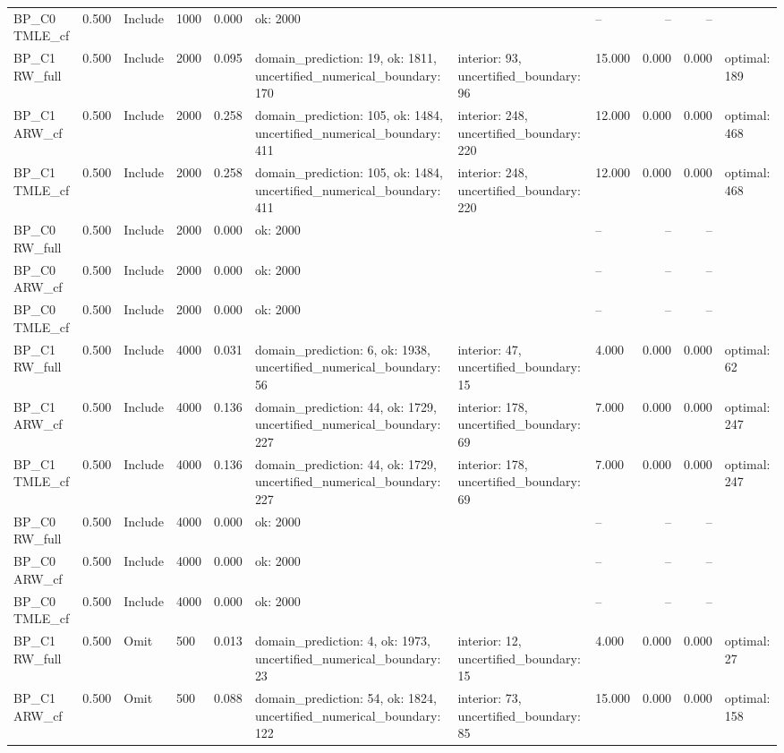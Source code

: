 \begin{tabular}{llllrlllrrl}
BP\_C0 TMLE\_cf & 0.500 & Include & 1000 & 0.000 & ok: 2000 &  & -- & -- & -- &  \\
BP\_C1 RW\_full & 0.500 & Include & 2000 & 0.095 & domain\_prediction: 19, ok: 1811, uncertified\_numerical\_boundary: 170 & interior: 93, uncertified\_boundary: 96 & 15.000 & 0.000 & 0.000 & optimal: 189 \\
BP\_C1 ARW\_cf & 0.500 & Include & 2000 & 0.258 & domain\_prediction: 105, ok: 1484, uncertified\_numerical\_boundary: 411 & interior: 248, uncertified\_boundary: 220 & 12.000 & 0.000 & 0.000 & optimal: 468 \\
BP\_C1 TMLE\_cf & 0.500 & Include & 2000 & 0.258 & domain\_prediction: 105, ok: 1484, uncertified\_numerical\_boundary: 411 & interior: 248, uncertified\_boundary: 220 & 12.000 & 0.000 & 0.000 & optimal: 468 \\
BP\_C0 RW\_full & 0.500 & Include & 2000 & 0.000 & ok: 2000 &  & -- & -- & -- &  \\
BP\_C0 ARW\_cf & 0.500 & Include & 2000 & 0.000 & ok: 2000 &  & -- & -- & -- &  \\
BP\_C0 TMLE\_cf & 0.500 & Include & 2000 & 0.000 & ok: 2000 &  & -- & -- & -- &  \\
BP\_C1 RW\_full & 0.500 & Include & 4000 & 0.031 & domain\_prediction: 6, ok: 1938, uncertified\_numerical\_boundary: 56 & interior: 47, uncertified\_boundary: 15 & 4.000 & 0.000 & 0.000 & optimal: 62 \\
BP\_C1 ARW\_cf & 0.500 & Include & 4000 & 0.136 & domain\_prediction: 44, ok: 1729, uncertified\_numerical\_boundary: 227 & interior: 178, uncertified\_boundary: 69 & 7.000 & 0.000 & 0.000 & optimal: 247 \\
BP\_C1 TMLE\_cf & 0.500 & Include & 4000 & 0.136 & domain\_prediction: 44, ok: 1729, uncertified\_numerical\_boundary: 227 & interior: 178, uncertified\_boundary: 69 & 7.000 & 0.000 & 0.000 & optimal: 247 \\
BP\_C0 RW\_full & 0.500 & Include & 4000 & 0.000 & ok: 2000 &  & -- & -- & -- &  \\
BP\_C0 ARW\_cf & 0.500 & Include & 4000 & 0.000 & ok: 2000 &  & -- & -- & -- &  \\
BP\_C0 TMLE\_cf & 0.500 & Include & 4000 & 0.000 & ok: 2000 &  & -- & -- & -- &  \\
BP\_C1 RW\_full & 0.500 & Omit & 500 & 0.013 & domain\_prediction: 4, ok: 1973, uncertified\_numerical\_boundary: 23 & interior: 12, uncertified\_boundary: 15 & 4.000 & 0.000 & 0.000 & optimal: 27 \\
BP\_C1 ARW\_cf & 0.500 & Omit & 500 & 0.088 & domain\_prediction: 54, ok: 1824, uncertified\_numerical\_boundary: 122 & interior: 73, uncertified\_boundary: 85 & 15.000 & 0.000 & 0.000 & optimal: 158 \\

\end{tabular}
